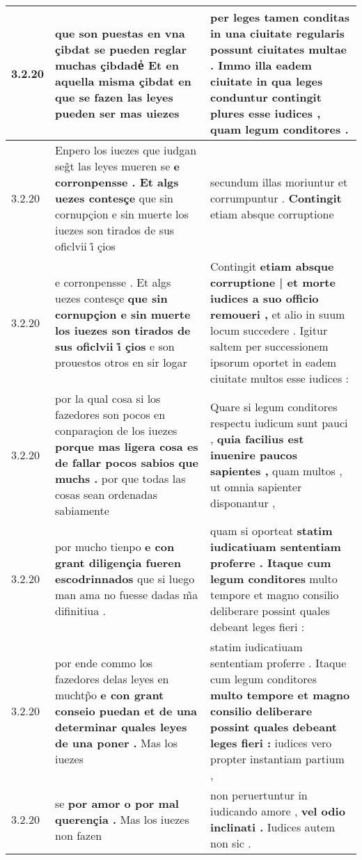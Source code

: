 \begin{tabular}{|p{1cm}|p{6.5cm}|p{6.5cm}|}
3.2.20 & que son puestas en vna çibdat se pueden reglar muchas çibdadeᷤ \textbf{ Et en aquella misma çibdat } en que se fazen las leyes pueden ser mas uiezes & per leges tamen conditas in una ciuitate regularis possunt ciuitates multae . Immo illa eadem ciuitate in \textbf{ qua leges conduntur contingit plures esse iudices , } quam legum conditores . \\\hline
3.2.20 & Enpero los iuezes que iudgan seg̃t las leyes mueren se \textbf{ e corronpensse . Et algs uezes contesçe } que sin cornupçion e sin muerte los iuezes son tirados de sus oficlvii i̊ çios & secundum illas moriuntur et corrumpuntur . \textbf{ Contingit } etiam absque corruptione \\\hline
3.2.20 & e corronpensse . Et algs uezes contesçe \textbf{ que sin cornupçion e sin muerte los iuezes son tirados de sus oficlvii i̊ çios } e son prouestos otros en sir logar & Contingit \textbf{ etiam absque corruptione | et morte iudices a suo officio remoueri , } et alio in suum locum succedere . Igitur saltem per successionem ipsorum oportet in eadem ciuitate multos esse iudices : \\\hline
3.2.20 & por la qual cosa si los fazedores son pocos en conparaçion de los iuezes \textbf{ porque mas ligera cosa es de fallar pocos sabios que muchs . } por que todas las cosas sean ordenadas sabiamente & Quare si legum conditores respectu iudicum sunt pauci , \textbf{ quia facilius est inuenire paucos sapientes , } quam multos , ut omnia sapienter disponantur , \\\hline
3.2.20 & por mucho tienpo \textbf{ e con grant diligençia fueren escodrinnados } que si luego man ama no fuesse dadas m̃a difinitiua . & quam si oporteat \textbf{ statim iudicatiuam sententiam proferre . Itaque cum legum conditores } multo tempore et magno consilio deliberare possint quales debeant leges fieri : \\\hline
3.2.20 & por ende commo los fazedores delas leyes en muchtp̃o \textbf{ e con grant conseio puedan et de una determinar quales leyes de una poner . } Mas los iuezes & statim iudicatiuam sententiam proferre . Itaque cum legum conditores \textbf{ multo tempore et magno consilio deliberare possint quales debeant leges fieri : } iudices vero propter instantiam partium , \\\hline
3.2.20 & se \textbf{ por amor o por mal querençia . } Mas los iuezes non fazen & non peruertuntur in iudicando amore , \textbf{ vel odio inclinati . } Iudices autem non sic . \\\hline

\end{tabular}
